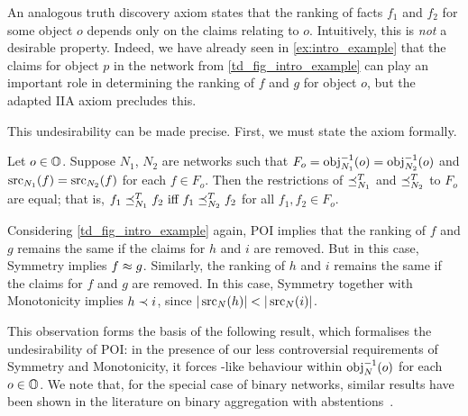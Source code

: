 

An analogous truth discovery axiom states that the ranking of facts $f_1$ and
$f_2$ for some object $o$ depends only on the claims relating to $o$.
Intuitively, this is \emph{not} a desirable property. Indeed, we have already
seen in \cref{ex:intro_example} that the claims for object $p$ in the
network from \cref{td_fig_intro_example} can play an important role in
determining the ranking of $f$ and $g$ for object $o$, but the adapted IIA
axiom precludes this.

This undesirability can be made precise. First, we must state the axiom
formally.

\begin{axiom}

Let $o \in \mathbb{O}$. Suppose $N_1$, $N_2$ are networks such that $F_o =
\operatorname{obj}_{N_1}^{-1}(o) = \operatorname{obj}_{N_2}^{-1}(o)$ and $\operatorname{src}_{N_1}(f) = \operatorname{src}_{N_2}(f)$
for each $f \in F_o$. Then the restrictions of $\preceq_{N_1}^T$ and
$\preceq_{N_2}^T$ to $F_o$ are equal; that is, $f_1 \fle_{N_1}^T f_2\ \textrm{iff
}f_1 \fle_{N_2}^T f_2$ for all $f_1, f_2 \in F_o$.

\end{axiom}

Considering \cref{td_fig_intro_example} again, POI implies that the ranking
of $f$ and $g$ remains the same if the claims for $h$ and $i$ are removed. But
in this case, Symmetry implies $f \approx g$. Similarly, the ranking of $h$ and
$i$ remains the same if the claims for $f$ and $g$ are removed. In this case,
Symmetry together with Monotonicity implies $h \prec i$, since $|\operatorname{src}_N(h)| <
|\operatorname{src}_N(i)|$.

This observation forms the basis of the following result, which formalises the
undesirability of POI: in the presence of our less controversial requirements
of Symmetry and Monotonicity, it forces \voting{}-like behaviour within
$\operatorname{obj}_N^{-1}(o)$ for each $o \in \mathbb{O}$.  We note that, for the special case of
binary networks, similar results have been shown in the literature on binary
aggregation with abstentions~\cite{christoffbinary}.

